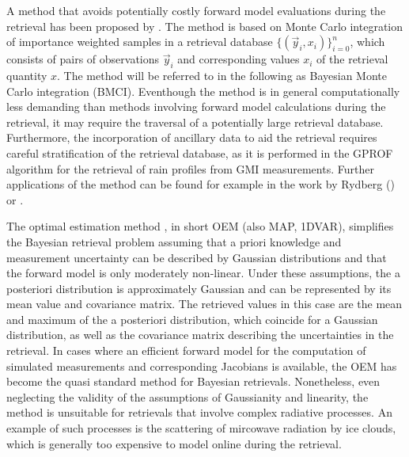 \documentclass[journal abbreviation, manuscript]{copernicus}
\begin{document}
A method that avoids potentially costly forward model evaluations during
the retrieval has been proposed by \cite{kummerow_1}. The method is based on
Monte Carlo integration of importance weighted samples in a retrieval database
$\{(\vec{y}_i, x_i)\}_{i = 0}^n$, which consists of pairs of observations $\vec{y}_i$
and corresponding values $x_i$ of the retrieval quantity $x$. The method will be
referred to in the following as Bayesian Monte Carlo integration (BMCI).
Eventhough the method is in general computationally less demanding than methods
involving forward model calculations during the retrieval, it may require the
traversal of a potentially large retrieval database. Furthermore, the
incorporation of ancillary data to aid the retrieval requires careful
stratification of the retrieval database, as it is performed in the GPROF
algorithm \citep{gprof} for the retrieval of rain profiles from GMI
measurements. Further applications of the method can be found for example in the
work by Rydberg (\citeyear{rydberg_2, rydberg_1}) or \cite{evans_2}.

The optimal estimation method \citep{rodgers}, in short OEM (also MAP, 1DVAR),
simplifies the Bayesian retrieval problem assuming that a priori knowledge and
measurement uncertainty can be described by Gaussian distributions and that the
forward model is only moderately non-linear. Under these assumptions, the a
posteriori distribution is approximately Gaussian and can be represented by its
mean value and covariance matrix. The retrieved values in this case are the mean
and maximum of the a posteriori distribution, which coincide for a Gaussian
distribution, as well as the covariance matrix describing the uncertainties in
the retrieval. In cases where an efficient forward model for the computation of
simulated measurements and corresponding Jacobians is available, the OEM has
become the quasi standard method for Bayesian retrievals. Nonetheless, even
neglecting the validity of the assumptions of Gaussianity and linearity, the
method is unsuitable for retrievals that involve complex radiative processes. An
example of such processes is the scattering of mircowave radiation by ice
clouds, which is generally too expensive to model online during the retrieval.
\end{document}
